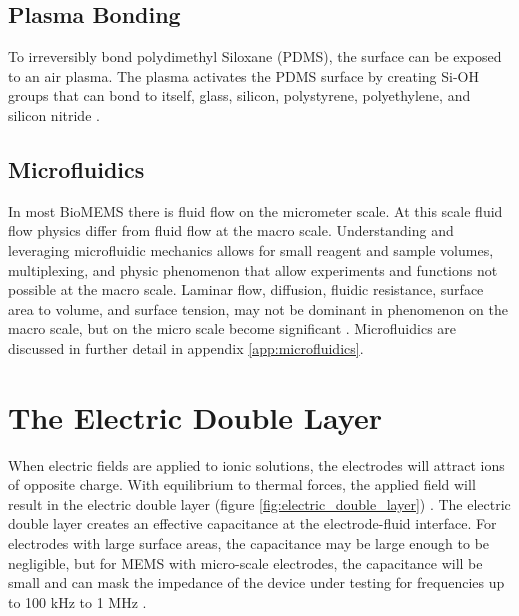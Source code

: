  
 \subsection*{Plasma Bonding}
 
 \par To irreversibly bond polydimethyl Siloxane (PDMS), the surface can be exposed to an air plasma. The plasma activates the PDMS surface by creating Si-OH groups that can bond to itself, glass, silicon, polystyrene, polyethylene, and silicon nitride \cite{mcdonald_polydimethylsiloxane_2002-1}.


 

 
 
 
 \subsection{Microfluidics}
 
\par In most BioMEMS there is fluid flow on the micrometer scale. At this scale fluid flow physics differ from fluid flow at the macro scale. Understanding and leveraging microfluidic mechanics allows for small reagent and sample volumes, multiplexing, and physic phenomenon that allow experiments and functions not possible at the macro scale. Laminar flow, diffusion, fluidic resistance, surface area to volume, and surface tension, may not be dominant in phenomenon on the macro scale, but on the micro scale become significant \cite{david_j._beebe_physics_2002}. Microfluidics are discussed in further detail in appendix \ref{app:microfluidics}.


\section{The Electric Double Layer}
\label{sec:the_electric_double_layer}

\par When electric fields are applied to ionic solutions, the electrodes will attract ions of opposite charge. With equilibrium to thermal forces, the applied field will result in the electric double layer (figure \ref{fig:electric_double_layer}) \cite{ishai_electrode_2013}. The electric double layer creates an effective capacitance at the electrode-fluid interface. For electrodes with large surface areas, the capacitance may be large enough to be negligible, but for MEMS with micro-scale electrodes, the capacitance will be small and can mask the impedance of the device under testing for frequencies up to 100 kHz to 1 MHz \cite{bordi_reduction_2001}. 

